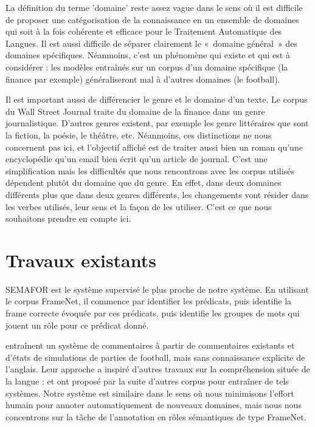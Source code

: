 La définition du terme 'domaine' reste assez vague dans le sens où il est
difficile de proposer une catégorisation de la connaissance en un ensemble de
domaines qui soit à la fois cohérente et efficace pour le Traitement
Automatique des Langues. Il est aussi difficile de séparer clairement le
«~domaine général~» des domaines spécifiques. Néanmoins, c'est un phénomène qui
existe et qui est à considérer : les modèles entraînés sur un corpus d'un
domaine spécifique (la finance par exemple) généraliseront mal à d'autres
domaines (le football).




Il est important aussi de différencier le genre et le domaine d'un texte. Le
corpus du Wall Street Journal traite du domaine de la finance dans un genre
journalistique. D'autres genres existent, par exemple les genre littéraires que
sont la fiction, la poésie, le théâtre, etc. Néanmoins, ces distinctions ne
nous concernent pas ici, et l'objectif affiché est de traiter aussi bien un
roman qu'une encyclopédie qu'un email bien écrit qu'un article de journal.
C'est une simplification mais les difficultés que nous rencontrons avec les
corpus utilisés dépendent plutôt du domaine que du genre. En effet, dans deux
domaines différents plus que dans deux genres différents, les changements vont
résider dans les verbes utilisés, leur sens et la façon de les utiliser. C'est
ce que nous souhaitons prendre en compte ici.

\section{Travaux existants}

SEMAFOR \citep{das2014frame} est le système supervisé le plus proche de notre
système. En utilisant le corpus FrameNet, il commence par identifier les
prédicats, puis identifie la frame correcte évoquée par ces prédicats, puis
identifie les groupes de mots qui jouent un rôle pour ce prédicat donné.

\cite{chen2008learning} entraînent un système de commentaires à partir de
commentaires existants et d'états de simulations de parties de football, mais
sans connaissance explicite de l'anglais. Leur approche a inspiré d'autres
travaux sur la compréhension située de la langue : \citep{bordes2010towards} et
\cite{richardson2012towards} ont proposé par la suite d'autres corpus pour
entraîner de tels systèmes. Notre système est similaire dans le sens où nous
minimisons l'effort humain pour annoter automatiquement de nouveaux domaines,
mais nous nous concentrons sur la tâche de l'annotation en rôles sémantiques de
type FrameNet.

